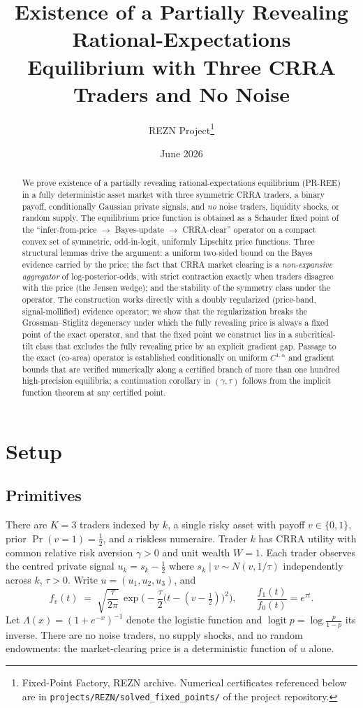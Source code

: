 \documentclass[11pt]{article}
\title{Existence of a Partially Revealing Rational-Expectations\\
Equilibrium with Three CRRA Traders and No Noise}
\author{REZN Project\thanks{Fixed-Point Factory, REZN archive. Numerical
certificates referenced below are in
\texttt{projects/REZN/solved\_fixed\_points/} of the project repository.}}
\date{June 2026}
\theoremstyle{definition}
\newcommand{\Lam}{\Lambda}
\begin{document}
\maketitle

\begin{abstract}
We prove existence of a partially revealing rational-expectations equilibrium
(PR-REE) in a fully deterministic asset market with three symmetric CRRA
traders, a binary payoff, conditionally Gaussian private signals, and
\emph{no} noise traders, liquidity shocks, or random supply. The equilibrium
price function is obtained as a Schauder fixed point of the
``infer-from-price $\to$ Bayes-update $\to$ CRRA-clear'' operator on a compact
convex set of symmetric, odd-in-logit, uniformly Lipschitz price functions.
Three structural lemmas drive the argument: a uniform two-sided bound on the
Bayes evidence carried by the price; the fact that CRRA market clearing is a
\emph{non-expansive aggregator} of log-posterior-odds, with strict contraction
exactly when traders disagree with the price (the Jensen wedge); and the
stability of the symmetry class under the operator. The construction works
directly with a doubly regularized (price-band, signal-mollified) evidence
operator; we show that the regularization breaks the Grossman--Stiglitz
degeneracy under which the fully revealing price is always a fixed point of
the exact operator, and that the fixed point we construct lies in a
subcritical-tilt class that excludes the fully revealing price by an explicit
gradient gap. Passage to the exact (co-area) operator is established
conditionally on uniform $C^{1,\alpha}$ and gradient bounds that are verified
numerically along a certified branch of more than one hundred high-precision
equilibria; a continuation corollary in $(\gamma,\tau)$ follows from the
implicit function theorem at any certified point.
\end{abstract}

\section{Setup}\label{sec:setup}

\subsection{Primitives}
There are $K=3$ traders indexed by $k$, a single risky asset with payoff
$v\in\{0,1\}$, prior $\Pr(v=1)=\tfrac12$, and a riskless numeraire. Trader
$k$ has CRRA utility with common relative risk aversion $\gamma>0$ and unit
wealth $W=1$. Each trader observes the centred private signal
$u_k=s_k-\tfrac12$ where $s_k\mid v\sim N(v,1/\tau)$ independently across
$k$, $\tau>0$. Write $u=(u_1,u_2,u_3)$, and
\begin{equation}\label{eq:density}
f_v(t)\;=\;\sqrt{\frac{\tau}{2\pi}}\,
\exp\!\Big(-\frac{\tau}{2}\big(t-(v-\tfrac12)\big)^2\Big),
\qquad
\frac{f_1(t)}{f_0(t)}=e^{\tau t}.
\end{equation}
Let $\Lam(x)=(1+e^{-x})^{-1}$ denote the logistic function and
$\operatorname{logit}p=\log\frac{p}{1-p}$ its inverse. There are no noise
traders, no supply shocks, and no random endowments: the market-clearing
price is a deterministic function of $u$ alone.
\end{document}
